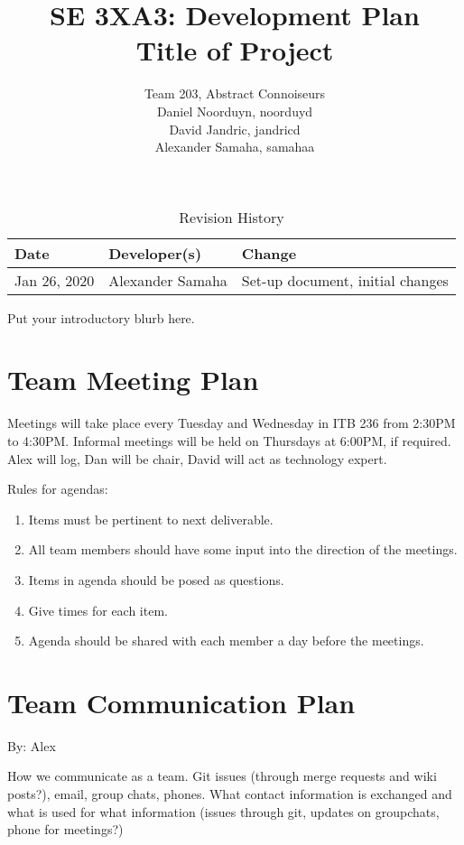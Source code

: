\documentclass{article}
\title{SE 3XA3: Development Plan\\Title of Project}
\author{Team 203, Abstract Connoiseurs\\
Daniel Noorduyn, noorduyd\\
David Jandric, jandricd\\
Alexander Samaha, samahaa\\
}
\date{}
\begin{document}
\begin{table}[hp]
\caption{Revision History} \label{TblRevisionHistory}
\begin{tabularx}{\textwidth}{llX}
\toprule
\textbf{Date} & \textbf{Developer(s)} & \textbf{Change}\\
\midrule
Jan 26, 2020 & Alexander Samaha & Set-up document, initial changes\\
\bottomrule
\end{tabularx}
\end{table}

\newpage

\maketitle

Put your introductory blurb here.

\section{Team Meeting Plan}

Meetings will take place every Tuesday and Wednesday in ITB 236 from 2:30PM to
4:30PM. Informal meetings will be held on Thursdays at 6:00PM, if required.
Alex will log, Dan will be chair, David will act as technology expert.

Rules for agendas:
\begin{enumerate}
    \item Items must be pertinent to next deliverable.
    \item All team members should have some input into the direction of the meetings.
    \item Items in agenda should be posed as questions.
    \item Give times for each item.
    \item Agenda should be shared with each member a day before the meetings.
\end{enumerate}

\section{Team Communication Plan}
By: Alex

How we communicate as a team.  Git issues (through merge requests and wiki
posts?), email, group chats, phones.  What contact information is exchanged and
what is used for what information (issues through git,  updates on groupchats,
phone for meetings?)
\end{document}
